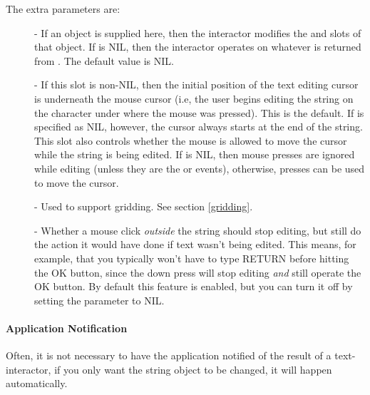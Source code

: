 The extra parameters are:
\begin{description}
\item[] 
- If an object is supplied here, then the interactor modifies the
 and  slots of that object.  If
 is NIL, then the
interactor operates on whatever is returned from .  The
default value is NIL.

\item[] 
- If this slot is non-NIL, then the initial position of the
text editing cursor is underneath the mouse cursor (i.e, the user begins
editing the string on the character under where the mouse was pressed).
This is the default.  If  is specified as NIL,
however, the cursor always starts at the end of the string.
This slot also controls whether the mouse is allowed to move the cursor
while the string is being edited.  If  is NIL, then
mouse presses are ignored while editing (unless they are the  or
 events), otherwise, presses can be used to move the cursor.

\item[] 
- Used to support gridding.  See section \ref{gridding}.

\item[] 
- Whether a mouse click {\it outside} the string should stop editing,
but still do the action it would have
done if text wasn't being edited.  This means, for example, that you
typically won't have to type RETURN before hitting the OK
button, since the down press will stop editing {\it and} still operate the
OK button.  By default this feature is enabled, but you can turn
it off by setting the  parameter to NIL.

\end{description}



\paragraph{Application Notification}

Often, it is not necessary to have the application notified of the result
of a text-interactor, if you only want the string object to be changed, it
will happen automatically.

